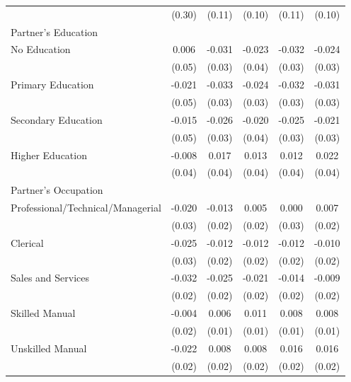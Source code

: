 \begin{longtable}{l*{5}{c}}
                    & (0.30) & (0.11) & (0.10) & (0.11) & (0.10) \\
\multicolumn{6}{l}{Partner's Education} \\
\hspace{1em}No Education & 0.006 & -0.031 & -0.023 & -0.032 & -0.024 \\
                    & (0.05) & (0.03) & (0.04) & (0.03) & (0.03) \\
\hspace{1em}Primary Education & -0.021 & -0.033 & -0.024 & -0.032 & -0.031 \\
                    & (0.05) & (0.03) & (0.03) & (0.03) & (0.03) \\
\hspace{1em}Secondary Education & -0.015 & -0.026 & -0.020 & -0.025 & -0.021 \\
                    & (0.05) & (0.03) & (0.04) & (0.03) & (0.03) \\
\hspace{1em}Higher Education & -0.008 & 0.017 & 0.013 & 0.012 & 0.022 \\
                    & (0.04) & (0.04) & (0.04) & (0.04) & (0.04) \\
\multicolumn{6}{l}{Partner's Occupation} \\
\hspace{1em}Professional/Technical/Managerial & -0.020 & -0.013 & 0.005 & 0.000 & 0.007 \\
                    & (0.03) & (0.02) & (0.02) & (0.03) & (0.02) \\
\hspace{1em}Clerical & -0.025 & -0.012 & -0.012 & -0.012 & -0.010 \\
                    & (0.03) & (0.02) & (0.02) & (0.02) & (0.02) \\
\hspace{1em}Sales and Services & -0.032\sym{*} & -0.025\sym{*} & -0.021 & -0.014 & -0.009 \\
                    & (0.02) & (0.02) & (0.02) & (0.02) & (0.02) \\
\hspace{1em}Skilled Manual & -0.004 & 0.006 & 0.011 & 0.008 & 0.008 \\
                    & (0.02) & (0.01) & (0.01) & (0.01) & (0.01) \\
\hspace{1em}Unskilled Manual & -0.022 & 0.008 & 0.008 & 0.016 & 0.016 \\
                    & (0.02) & (0.02) & (0.02) & (0.02) & (0.02) \\

\end{longtable}
